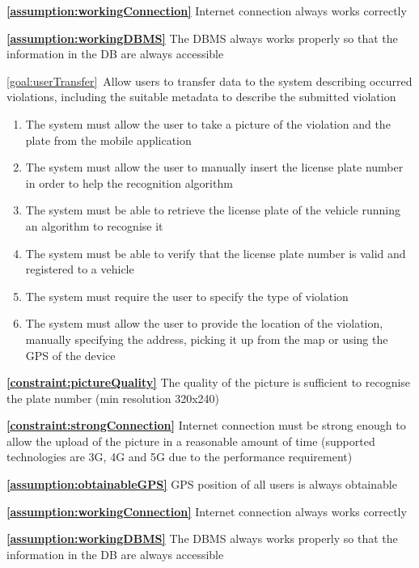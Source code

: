 \begin{description}
			\textbf{\ref{assumption:workingConnection}} Internet connection always works correctly
			
			\textbf{\ref{assumption:workingDBMS}} The DBMS always works properly so that the information in the DB are always accessible
			
		\item \ref{goal:userTransfer}\ Allow users to transfer data to the system describing occurred violations, including the suitable metadata to describe the submitted violation			
			 \begin{enumerate}[resume*]
				\item The system must allow the user to take a picture of the violation and the plate from the mobile application
  				\item The system must allow the user to manually insert the license plate number in order to help the recognition algorithm
  				\item The system must be able to retrieve the license plate of the vehicle running an algorithm to recognise it
  				\item The system must be able to verify that the license plate number is valid and registered to a vehicle
  				\item The system must require the user to specify the type of violation
  				\item The system must allow the user to provide the location of the violation, manually specifying the address, picking it up from the map or using the GPS of the device
   			\end{enumerate}
   			
   			\textbf{\ref{constraint:pictureQuality}} The quality of the picture is sufficient to recognise the plate number (min resolution 320x240)
   			
			\textbf{\ref{constraint:strongConnection}} Internet connection must be strong enough to allow the upload of the picture in a reasonable amount of time (supported technologies are 3G, 4G and 5G due to the performance requirement)
			
			\textbf{\ref{assumption:obtainableGPS}} GPS position of all users is always obtainable
			
			\textbf{\ref{assumption:workingConnection}} Internet connection always works correctly
			
			\textbf{\ref{assumption:workingDBMS}} The DBMS always works properly so that the information in the DB are always accessible
			

\end{description}
